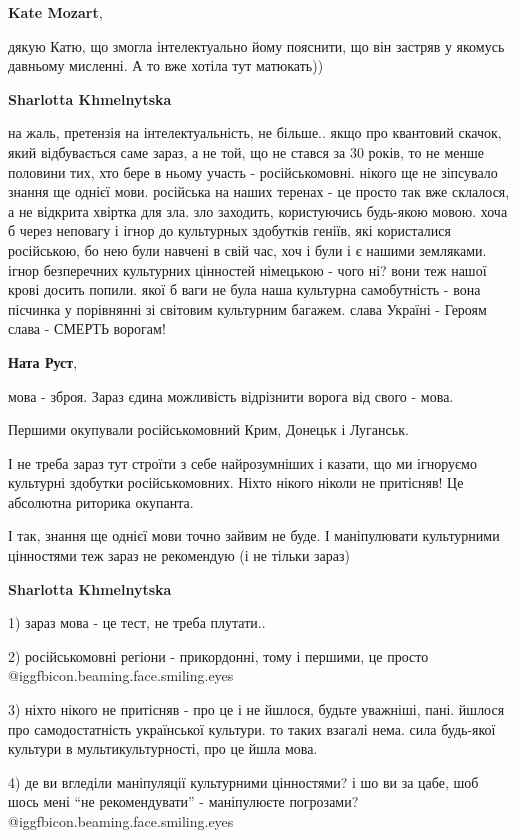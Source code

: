 \begin{itemize}
\begin{itemize} %
\textbf{Kate Mozart}, 

дякую Катю, що змогла інтелектуально йому пояснити, що він застряв у якомусь
давньому мисленні. А то вже хотіла тут матюкать))


\textbf{Sharlotta Khmelnytska} 

на жаль, претензія на інтелектуальність, не більше.. якщо про квантовий скачок,
який відбувається саме зараз, а не той, що не стався за 30 років, то не менше
половини тих, хто бере в ньому участь - російськомовні. нікого ще не зіпсувало
знання ще однієї мови. російська на наших теренах - це просто так вже склалося,
а не відкрита хвіртка для зла. зло заходить, користуючись будь-якою мовою. хоча
б через неповагу і ігнор до культурных здобутків геніїв, які користалися
російською, бо нею були навчені в свій час, хоч і були і є нашими земляками.
ігнор безперечних культурних цінностей німецькою - чого ні? вони теж нашої
крові досить попили. якої б ваги не була наша культурна самобутність - вона
пісчинка у порівнянні зі світовим культурним багажем. слава Україні - Героям
слава - СМЕРТЬ ворогам!

\textbf{Ната Руст}, 

мова - зброя. Зараз єдина можливість відрізнити ворога від свого - мова.

Першими окупували російськомовний Крим, Донецьк і Луганськ.

І не треба зараз тут строїти з себе найрозумніших і казати, що ми ігноруємо
культурні здобутки російськомовних. Ніхто нікого ніколи не притісняв! Це
абсолютна риторика окупанта.

І так, знання ще однієї мови точно зайвим не буде. І маніпулювати культурними
цінностями теж зараз не рекомендую (і не тільки зараз)

\textbf{Sharlotta Khmelnytska} 

1) зараз мова - це тест, не треба плутати.. 

2) російськомовні регіони - прикордонні, тому і першими, це просто  @igg{fbicon.beaming.face.smiling.eyes}  

3) ніхто нікого не притісняв - про це і не йшлося, будьте уважніші, пані.
йшлося про самодостатність української культури. то таких взагалі нема. сила
будь-якої культури в мультикультурності, про це йшла мова. 

4) де ви вгледіли маніпуляції культурними цінностями? і шо ви за цабе, шоб шось
мені \enquote{не рекомендувати} - маніпулюєте погрозами?  @igg{fbicon.beaming.face.smiling.eyes} 


\end{itemize}
\end{itemize}
